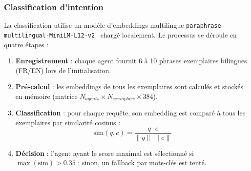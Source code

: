 \documentclass[12pt, a4paper]{article}
\begin{document}
\subsubsection{Classification d'intention}

La classification utilise un modèle d'embeddings multilingue \texttt{paraphrase-multilingual-MiniLM-L12-v2}~\cite{reimers2019sentence} chargé localement. Le processus se déroule en quatre étapes :

\begin{enumerate}
  \item \textbf{Enregistrement} : chaque agent fournit 6 à 10 phrases exemplaires bilingues (FR/EN) lors de l'initialisation.
  \item \textbf{Pré-calcul} : les embeddings de tous les exemplaires sont calculés et stockés en mémoire (matrice $N_{agents} \times N_{exemplars} \times 384$).
  \item \textbf{Classification} : pour chaque requête, son embedding est comparé à tous les exemplaires par similarité cosinus :
  \begin{equation}
    \text{sim}(q, e) = \frac{q \cdot e}{\|q\| \cdot \|e\|}
    \label{eq:cosine}
  \end{equation}
  \item \textbf{Décision} : l'agent ayant le score maximal est sélectionné si $\max(\text{sim}) > 0.35$ ; sinon, un fallback par mots-clés est tenté.
\end{enumerate}
\end{document}
